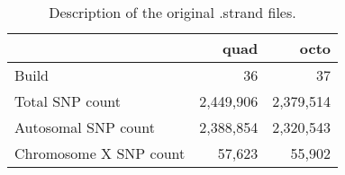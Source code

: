 \begin{table}[h]
\centering
\begin{tabular}{l|rr}
\hline
                       & quad      & octo      \\ \hline
Build                  & 36        & 37        \\
Total SNP count        & 2,449,906 & 2,379,514 \\
Autosomal SNP count    & 2,388,854 & 2,320,543 \\
Chromosome X SNP count & 57,623    & 55,902   
\end{tabular}
\caption{Description of the original .strand files.}
\label{tab:strand_files}
\end{table}